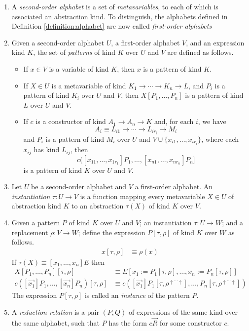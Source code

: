\documentclass[envcountsame]{llncs}
\begin{document}
\begin{definition}
\begin{enumerate}
 \item 
 A \emph{second-order alphabet} is a set of \emph{metavariables}, to each of which is associated an abstraction kind.  To distinguish, the alphabets defined in
 Definition \ref{definition:alphabet} are now called \emph{first-order alphabets}
\item 
 Given a second-order alphabet $U$, a first-order alphabet $V$, and an expression kind $K$, the set of \emph{patterns} of kind $K$ over $U$ and $V$ are defined as follows.
 \begin{itemize}
  \item If $x \in V$ is a variable of kind $K$, then $x$ is a pattern of kind $K$.
  \item If $X \in U$ is a metavariable of kind $K_1 \rightarrow \cdots \rightarrow K_n \rightarrow L$, and $P_i$ is a pattern of kind $K_i$ over $U$ and $V$,
  then $X[P_1, \ldots, P_n]$ is a pattern of kind $L$ over $U$ and $V$.
  \item If $c$ is a constructor of kind $A_1 \rightarrow A_n \rightarrow K$ and, for each $i$, we have
  \[ A_i \equiv L_{i1} \rightarrow \cdots \rightarrow L_{ir_i} \rightarrow M_i \]
  and $P_i$ is a pattern of kind $M_i$ over $U$ and $V \cup \{ x_{i1}, \ldots, x_{ir_i} \}$, where each $x_{ij}$ has kind $L_{ij}$, then
  \[ c([x_{11}, \ldots, x_{1r_1}] P_1, \ldots, [x_{n1}, \ldots, x_{nr_n}] P_n ] \]
  is a pattern of kind $K$ over $U$ and $V$.
 \end{itemize}
\item
Let $U$ be a second-order alphabet and $V$ a first-order alphabet.  An \emph{instantiation} $\tau : U \rightarrow V$ is a function mapping every metavariable
$X \in U$ of abstraction kind $K$ to an abstraction $\tau(X)$ of kind $K$ over $V$.
\item 
Given a pattern $P$ of kind $K$ over $U$ and $V$; an instantiation $\tau : U \rightarrow W$; and a replacement $\rho : V \rightarrow W$; define the
expression $P[\tau, \rho]$ of kind $K$ over $W$ as follows.
\begin{align*}
 x[\tau, \rho] & \equiv \rho(x)
\end{align*}
If $\tau(X) \equiv [x_1, \ldots, x_n]E$ then
\begin{align*}
 X[P_1, \ldots, P_n][\tau, \rho] & \equiv E[x_1 := P_1[\tau, \rho], \ldots, x_n := P_n[\tau, \rho]] \\
 c([\vec{x_1}]P_1, \ldots, [\vec{x_n}]P_n)[\tau, \rho] & \equiv c([\vec{x_1}] P_1[\tau, \rho^{\uparrow \cdots \uparrow}], \ldots,
 P_n[\tau, \rho^{\uparrow \cdots \uparrow}])
\end{align*}
The expression $P[\tau, \rho]$ is called an \emph{instance} of the pattern $P$.
\item
A \emph{reduction relation} is a pair $(P,Q)$ of expressions of the same kind over the same alphabet, such that $P$ has the form $c \vec{R}$ for some constructor $c$.
\end{enumerate}
\end{definition}
\end{document}
